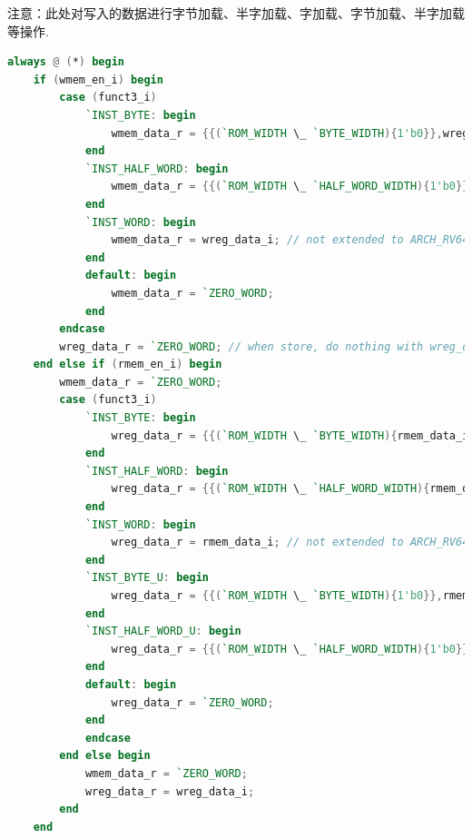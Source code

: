 \documentclass[lang=cn,11pt,a4paper,chinesefont=founder]{elegantpaper}
\begin{document}
注意：此处对写入的数据进行字节加载、半字加载、字加载、字节加载、半字加载等操作. 
\begin{lstlisting}[language=verilog]
always @ (*) begin
	if (wmem_en_i) begin
		case (funct3_i)
			`INST_BYTE: begin
				wmem_data_r = {{(`ROM_WIDTH \_ `BYTE_WIDTH){1'b0}},wreg_data_i[`BYTE_WIDTH \_ 1:0]};
			end
			`INST_HALF_WORD: begin
				wmem_data_r = {{(`ROM_WIDTH \_ `HALF_WORD_WIDTH){1'b0}},wreg_data_i[`HALF_WORD_WIDTH \_ 1:0]};
			end
			`INST_WORD: begin
				wmem_data_r = wreg_data_i; // not extended to ARCH_RV64, so the code has been simplified
			end
			default: begin
				wmem_data_r = `ZERO_WORD;
			end
		endcase
		wreg_data_r = `ZERO_WORD; // when store, do nothing with wreg_data
	end else if (rmem_en_i) begin
		wmem_data_r = `ZERO_WORD;
		case (funct3_i)
			`INST_BYTE: begin
				wreg_data_r = {{(`ROM_WIDTH \_ `BYTE_WIDTH){rmem_data_i[`BYTE_WIDTH \_ 1]}},rmem_data_i[`BYTE_WIDTH \_ 1:0]};
			end
			`INST_HALF_WORD: begin
				wreg_data_r = {{(`ROM_WIDTH \_ `HALF_WORD_WIDTH){rmem_data_i[`HALF_WORD_WIDTH \_ 1]}},rmem_data_i[`HALF_WORD_WIDTH \_ 1]};
			end
			`INST_WORD: begin
				wreg_data_r = rmem_data_i; // not extended to ARCH_RV64, so the code has been simplified
			end
			`INST_BYTE_U: begin
				wreg_data_r = {{(`ROM_WIDTH \_ `BYTE_WIDTH){1'b0}},rmem_data_i[`BYTE_WIDTH \_ 1:0]};
			end
			`INST_HALF_WORD_U: begin
				wreg_data_r = {{(`ROM_WIDTH \_ `HALF_WORD_WIDTH){1'b0}},rmem_data_i[`HALF_WORD_WIDTH \_ 1]};
			end
			default: begin
				wreg_data_r = `ZERO_WORD;
			end
			endcase
		end else begin
			wmem_data_r = `ZERO_WORD;
			wreg_data_r = wreg_data_i;
		end
	end
\end{lstlisting}
\end{document}
